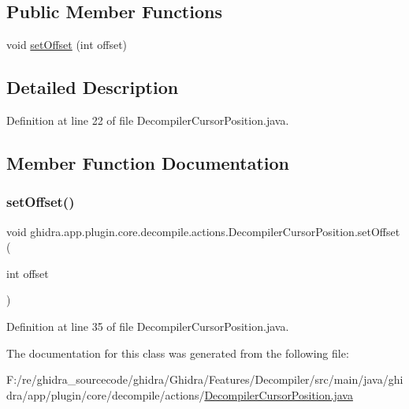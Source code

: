 \subsection*{Public Member Functions}
\begin{DoxyCompactItemize}
\item 
void \mbox{\hyperlink{classghidra_1_1app_1_1plugin_1_1core_1_1decompile_1_1actions_1_1_decompiler_cursor_position_a6db47e3bf2673455115df6ae0f5b2cb8}{set\+Offset}} (int offset)
\end{DoxyCompactItemize}


\subsection{Detailed Description}


Definition at line 22 of file Decompiler\+Cursor\+Position.\+java.



\subsection{Member Function Documentation}
\mbox{\label{classghidra_1_1app_1_1plugin_1_1core_1_1decompile_1_1actions_1_1_decompiler_cursor_position_a6db47e3bf2673455115df6ae0f5b2cb8}} 
\subsubsection{\texorpdfstring{setOffset()}{setOffset()}}
{\footnotesize\ttfamily void ghidra.\+app.\+plugin.\+core.\+decompile.\+actions.\+Decompiler\+Cursor\+Position.\+set\+Offset (\begin{DoxyParamCaption}\item[{int}]{offset }\end{DoxyParamCaption})\hspace{0.3cm}{\ttfamily [inline]}}



Definition at line 35 of file Decompiler\+Cursor\+Position.\+java.



The documentation for this class was generated from the following file\+:\begin{DoxyCompactItemize}
\item 
F\+:/re/ghidra\+\_\+sourcecode/ghidra/\+Ghidra/\+Features/\+Decompiler/src/main/java/ghidra/app/plugin/core/decompile/actions/\mbox{\hyperlink{_decompiler_cursor_position_8java}{Decompiler\+Cursor\+Position.\+java}}\end{DoxyCompactItemize}
